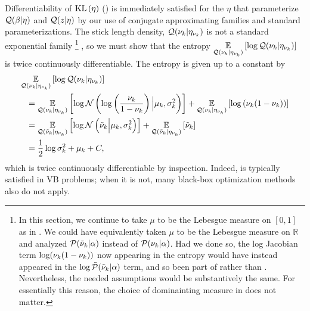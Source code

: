 Differentiability of $\mathrm{KL}\left(\eta\right)$ () is
immediately satisfied for the $\eta$ that parameterize $\mathcal{Q}(\beta \vert \eta)$
and $\mathcal{Q}(z \vert \eta)$ by our use of conjugate approximating families and
standard parameterizations.  The stick length density, $\mathcal{Q}(\nu_{k} \vert \eta_{\nu_{k}})$
is not a standard exponential family
%
\footnote{In this section, we continue to take $\mu$ to be the Lebesgue measure
on $[0,1]$ as in .  We could have equivalently taken
$\mu$ to be the Lebesgue measure on $\mathbb{R}$ and analyzed $\mathcal{P}(\tilde{\nu}_{k} \vert
\alpha)$ instead of $\mathcal{P}(\nu_{k} \vert \alpha)$.  Had we done so, the log Jacobian
term $\log (\nu_{k}(1 - \nu_{k}))$ now appearing in the entropy would have instead
appeared in the $\log \tilde{\mathcal{P}}(\tilde{\nu}_{k} \vert \alpha)$ term, and so been part of
 rather than .
Nevertheless, the needed assumptions would be substantively the same. For
essentially this reason, the choice of dominainting measure in 
does not matter.}
%
, so we must show that the entropy $\underset{\mathcal{Q}(\nu_{k} \vert \eta_{\nu_{k}})}{\mathbb{E}}\left[\log \mathcal{Q}(\nu_{k}
\vert \eta_{\nu_{k}})\right]$ is  twice continuously differentiable. The entropy is given up
to a constant by
%
\begin{align*}
%
\MoveEqLeft
\expect{\q(\nuk \vert \etanuk)}{\log \q(\nuk \vert \etanuk)}
\\={}&
    \expect{\q(\nuk \vert \etanuk)}
           {\log \normdist{\log\left(\frac{\nu_\k}{1 - \nu_\k} \right)
               \Big\vert  \mu_\k, \sigma^2_\k}} +
    \expect{\q(\nuk \vert \etanuk)}
           {\log \left(\nuk (1 - \nuk)\right)}
\\={}&
   \expect{\q(\lnuk \vert \etanuk)}
          {\log \normdist{\lnuk \Big\vert  \mu_\k, \sigma^2_\k}} +
   \expect{\q(\lnuk \vert \etanuk)}{\lnuk}
\\={}&
    \frac{1}{2} \log \sigma^2_\k + \mu_\k + \const,
%
\end{align*}
%
which is twice continuously differentiable by inspection.
%
Indeed,  is typically satisfied in VB
problems; when it is not, many black-box optimization methods also do not apply.

